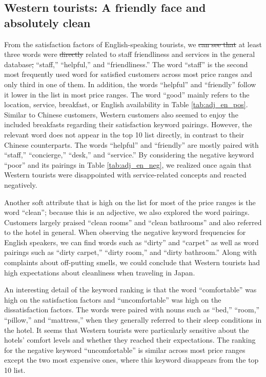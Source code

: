 \documentclass[smallextended,natbib]{svjour3}       %
\providecommand{\DIFadd}[1]{{\protect\color{blue}\uwave{#1}}} %
\providecommand{\DIFdel}[1]{{\protect\color{red}\sout{#1}}}                      %
\providecommand{\DIFaddbegin}{} %
\providecommand{\DIFaddend}{} %
\providecommand{\DIFdelbegin}{} %
\providecommand{\DIFdelend}{} %
\newcommand{\DIFscaledelfig}{0.5}
\newlength{\DIFdelgraphicswidth} %
\newlength{\DIFdelgraphicsheight} %
\newcommand{\DIFaddincludegraphics}[2][]{{\color{blue}\fbox{\DIFOincludegraphics[#1]{#2}}}} %
\newcommand{\DIFdelincludegraphics}[2][]{%
\sbox{\DIFdelgraphicsbox}{\DIFOincludegraphics[#1]{#2}}%
\settoboxwidth{\DIFdelgraphicswidth}{\DIFdelgraphicsbox} %
\settoboxtotalheight{\DIFdelgraphicsheight}{\DIFdelgraphicsbox} %
\scalebox{\DIFscaledelfig}{%
\parbox[b]{\DIFdelgraphicswidth}{\usebox{\DIFdelgraphicsbox}\\[-\baselineskip] \rule{\DIFdelgraphicswidth}{0em}}\llap{\resizebox{\DIFdelgraphicswidth}{\DIFdelgraphicsheight}{%
\setlength{\unitlength}{\DIFdelgraphicswidth}%
\begin{picture}(1,1)%
\thicklines\linethickness{2pt} %
{\color[rgb]{1,0,0}\put(0,0){\framebox(1,1){}}}%
{\color[rgb]{1,0,0}\put(0,0){\line( 1,1){1}}}%
{\color[rgb]{1,0,0}\put(0,1){\line(1,-1){1}}}%
\end{picture}%
}\hspace*{3pt}}} %
} %
\DeclareRobustCommand{\DIFaddbegin}{\DIFOaddbegin \let\includegraphics\DIFaddincludegraphics} %
\DeclareRobustCommand{\DIFaddend}{\DIFOaddend \let\includegraphics\DIFOincludegraphics} %
\DeclareRobustCommand{\DIFdelbegin}{\DIFOdelbegin \let\includegraphics\DIFdelincludegraphics} %
\DeclareRobustCommand{\DIFdelend}{\DIFOaddend \let\includegraphics\DIFOincludegraphics} %
\begin{document}
  \subsection{Western tourists: A friendly face and absolutely clean}\label{disc:en}

    From the satisfaction factors of English-speaking tourists, we \DIFdelbegin \DIFdel{can see that }\DIFdelend \DIFaddbegin \DIFadd{observed }\DIFaddend at least three words were \DIFdelbegin \DIFdel{directly }\DIFdelend related to staff friendliness and services in the general database\DIFdelbegin \DIFdel{, }\DIFdelend \DIFaddbegin \DIFadd{: }\DIFaddend ``staff,'' ``helpful,'' and ``friendliness.'' The word ``staff'' is the second most frequently used word for satisfied customers across most price ranges and only third in one of them. In addition, the words ``helpful'' and ``friendly'' follow it lower in the list in most price ranges. The word ``good'' mainly refers to the location, service, breakfast, or English availability in Table \ref{tab:adj_en_pos}. Similar to Chinese customers, Western customers also seemed to enjoy the included breakfasts regarding their satisfaction keyword pairings. However, the relevant word does not appear in the top 10 list directly, in contrast to their Chinese counterparts. The words ``helpful'' and ``friendly'' are mostly paired with ``staff,'' ``concierge,'' ``desk,'' and ``service.'' By considering the negative keyword ``poor'' and its pairings in Table \ref{tab:adj_en_neg}, we realized once again that Western tourists were disappointed with service-related concepts and reacted negatively.

    Another soft attribute that is high on the list for most of the price ranges is the word ``clean''; because this is an adjective, we also explored the word pairings. Customers largely praised ``clean rooms'' and ``clean bathrooms'' and also referred to the hotel in general. When observing the negative keyword frequencies for English speakers, we can find words such as ``dirty'' and ``carpet'' as well as word pairings such as ``dirty carpet,'' ``dirty room,'' and ``dirty bathroom.'' Along with complaints about off-putting smells, we could conclude that Western tourists had high expectations about cleanliness when traveling in Japan.

    An interesting detail of the keyword ranking is that the word ``comfortable'' was high on the satisfaction factors and ``uncomfortable'' was high on the dissatisfaction factors. The words were paired with nouns such as ``bed,'' ``room,'' ``pillow,'' and ``mattress,'' when they generally referred to their sleep conditions in the hotel.
    It seems that Western tourists were particularly sensitive about the hotels’ comfort levels and whether they reached their expectations. The ranking for the negative keyword ``uncomfortable'' is similar across most price ranges except the two most expensive ones, where this keyword disappears from the top 10 list.
\end{document}
